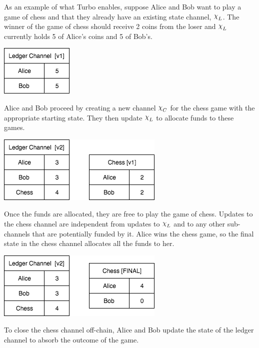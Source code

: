 \documentclass{article}
\DeclareRobustCommand{\rchi}{{\mathpalette\irchi\relax}}
\newcommand{\irchi}[2]{\raisebox{\depth}{$#1\chi$}} %
\theoremstyle{definition}
\begin{document}
As an example of what Turbo enables, suppose Alice and Bob want to play a game of chess and that
they already have an existing state channel, $\rchi_L$.
The winner of the game of chess should receive 2 coins from the loser and $\rchi_L$ currently holds
5 of Alice's coins and 5 of Bob's.

\begin{center}
  \includegraphics[scale=0.5]{turbo_start} %
\end{center}

Alice and Bob proceed by creating a new channel $\rchi_C$ for the chess game with the appropriate starting state.
They then update $\rchi_L$ to allocate funds to these games.

\begin{center}
  \includegraphics[scale=0.5]{turbo_open} %
\end{center}

Once the funds are allocated, they are free to play the game of chess.
Updates to the chess channel are independent from updates to $\rchi_L$ and to
any other sub-channels that are potentially funded by it. 
Alice wins the chess game, so the final state in the chess channel allocates all the
funds to her.

\begin{center}
  \includegraphics[scale=0.5]{turbo_close} %
\end{center}

To close the chess channel off-chain, Alice and Bob update the state of the ledger channel to absorb the outcome of the game.
\end{document}
